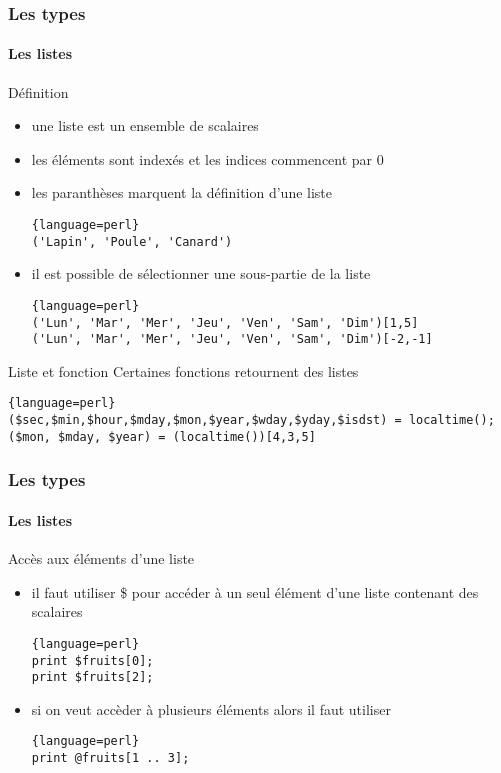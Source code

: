 \begin{frame}[fragile]
  \frametitle{Les types}
  \framesubtitle{Les listes}

  \begin{block}{Définition}
    \begin{itemize}
      \item une liste est un ensemble de scalaires
      \item les éléments sont indexés et les indices commencent par 0
      \item les paranthèses marquent la définition d'une liste
        \begin{lstlisting}{language=perl}
('Lapin', 'Poule', 'Canard')
        \end{lstlisting}
      \item il est possible de sélectionner une sous-partie de la liste
        \begin{lstlisting}{language=perl}
('Lun', 'Mar', 'Mer', 'Jeu', 'Ven', 'Sam', 'Dim')[1,5]
('Lun', 'Mar', 'Mer', 'Jeu', 'Ven', 'Sam', 'Dim')[-2,-1]
        \end{lstlisting}
    \end{itemize}
  \end{block}

  \begin{alertblock}{Liste et fonction}
    Certaines fonctions retournent des listes
    \begin{lstlisting}{language=perl}
($sec,$min,$hour,$mday,$mon,$year,$wday,$yday,$isdst) = localtime();
($mon, $mday, $year) = (localtime())[4,3,5]
    \end{lstlisting}
  \end{alertblock}

\end{frame}

\begin{frame}[fragile]
  \frametitle{Les types}
  \framesubtitle{Les listes}

  \begin{block}{Accès aux éléments d'une liste}
    \begin{itemize}
    \item il faut utiliser \$ pour accéder à un seul élément d'une liste
      contenant des scalaires
      \begin{lstlisting}{language=perl}
print $fruits[0];
print $fruits[2];
      \end{lstlisting}
    \item si on veut accèder à plusieurs éléments alors il faut utiliser \@
      \begin{lstlisting}{language=perl}
print @fruits[1 .. 3];
      \end{lstlisting}
    \end{itemize}
  \end{block}

\end{frame}

